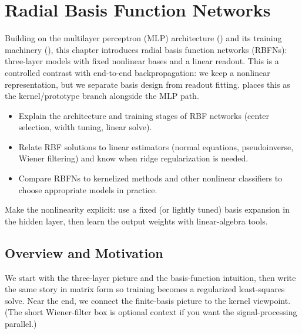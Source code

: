\section{Radial Basis Function Networks}\label{chap:rbf}

Building on the multilayer perceptron (MLP) architecture () and its training machinery (), this chapter introduces radial basis function networks (RBFNs): three\hyp{}layer models with fixed nonlinear bases and a linear readout. This is a controlled contrast with end-to-end backpropagation: we keep a nonlinear representation, but we separate basis design from readout fitting.  places this as the kernel/prototype branch alongside the MLP path.

\begin{tcolorbox}[summarybox, title={Learning Outcomes}]
\begin{itemize}
    \item Explain the architecture and training stages of RBF networks (center selection, width tuning, linear solve).
    \item Relate RBF solutions to linear estimators (normal equations, pseudoinverse, Wiener filtering) and know when ridge regularization is needed.
    \item Compare RBFNs to kernelized methods and other nonlinear classifiers to choose appropriate models in practice.
\end{itemize}
\end{tcolorbox}

\begin{tcolorbox}[summarybox, title={Design motif}]
Make the nonlinearity explicit: use a fixed (or lightly tuned) basis expansion in the hidden layer, then learn the output weights with linear-algebra tools.
\end{tcolorbox}

\subsection{Overview and Motivation}
\label{sec:rbf_overview_and_motivation}

We start with the three-layer picture and the basis-function intuition, then write the same story in matrix form so training becomes a regularized least-squares solve. Near the end, we connect the finite-basis picture to the kernel viewpoint. (The short Wiener-filter box is optional context if you want the signal-processing parallel.)

